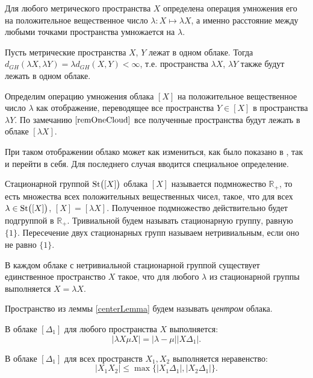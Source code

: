 Для любого метрического пространства $X$ определена операция умножения его
на положительное вещественное число $\lambda\colon X\mapsto \lambda X$, а именно
расстояние между любыми точками
пространства умножается на $\lambda$.
\begin{remark} Пусть метрические
  пространства $X$, $Y$ лежат в одном облаке. Тогда
  $d_{GH}(\lambda X, \lambda Y) = \lambda d_{GH}(X,Y) < \infty$, т.е.
  пространства
  $\lambda X$, $\lambda Y$ также будут лежать в одном облаке.
  \label{remOneCloud}
\end{remark}
\begin{defin}Определим операцию умножения облака $[X]$ на
  положительное вещественное
  число $\lambda$ как отображение, переводящее все пространства $Y \in [X]$ в
  пространства $\lambda Y$. По замечанию $\ref{remOneCloud}$ все
  полученные пространства будут
  лежать в облаке $[\lambda X]$.
\end{defin}
При таком отображении облако может как
измениться, как было показано в \cite{TuzhBog2}, так и перейти в
себя. Для последнего случая вводится специальное
определение.
\begin{defin}
  Стационарной группой $\operatorname{St}\bigl([X]\bigr)$ облака $[X]$
  называется подмножество $\mathbb{R}_+$, то есть множества всех
  положительных вещественных чисел, такое, что для всех
  $\lambda \in \operatorname{St}\bigl([X]\bigr)$, $[X] = [\lambda X]$. Полученное подмножество
  действительно будет подгруппой в $\mathbb{R}_+$. Тривиальной
  будем называть стационарную группу, равную $\{1\}$. Пересечение
  двух стационарных групп называем нетривиальным, если оно не равно \( \{1\} \).
\end{defin}

\begin{lemma}
  В каждом облаке с нетривиальной стационарной группой существует единственное
  пространство $X$ такое, что для любого $\lambda$ из стационарной группы
  выполняется $X = \lambda X$.
  \label{centerLemma}
\end{lemma}
\begin{defin}
  Пространство из леммы \ref{centerLemma} будем называть \emph{центром} облака.
\end{defin}
\begin{remark} В
  облаке $[\Delta_1]$ для любого пространства $X$ выполняется:
  $$|\lambda X \mu X| = |\lambda - \mu||X\Delta_1|.$$
\end{remark}
\begin{remark} В облаке
  $[\Delta_{1}]$ для всех пространств $X_{1}, X_{2}$ выполняется неравенство:
  $$|X_{1}X_{2}| \le \max\big\{|X_{1} \Delta_{1}|,|X_{2}\Delta_{1}|\big\}.$$
  \label{remUltraMetric}
\end{remark}

